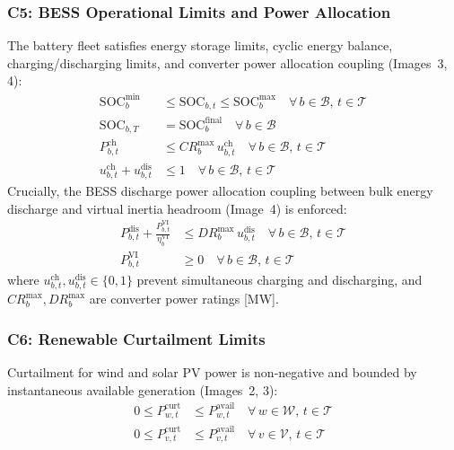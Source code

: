 \documentclass[journal]{IEEEtran}
\begin{document}
\subsubsection{C5: BESS Operational Limits and Power Allocation}
The battery fleet satisfies energy storage limits, cyclic energy balance, charging/discharging limits, and converter power allocation coupling (Images~3, 4):
\begin{align}
  \text{SOC}_b^{\min} &\leq \text{SOC}_{b,t} \leq \text{SOC}_b^{\max} \quad \forall\,b \in \mathcal{B},\,t \in \mathcal{T}
  \label{eq:soc_limits} \\
  \text{SOC}_{b,T} &= \text{SOC}_b^{\text{final}} \quad \forall\,b \in \mathcal{B}
  \label{eq:final_soc} \\
  P_{b,t}^{\text{ch}} &\leq CR_b^{\max}\,u_{b,t}^{\text{ch}} \quad \forall\,b \in \mathcal{B},\,t \in \mathcal{T}
  \label{eq:ch_limit} \\
  u_{b,t}^{\text{ch}} + u_{b,t}^{\text{dis}} &\leq 1 \quad \forall\,b \in \mathcal{B},\,t \in \mathcal{T}
  \label{eq:no_sim_ch_dis}
\end{align}
Crucially, the BESS discharge power allocation coupling between bulk energy discharge and virtual inertia headroom (Image~4) is enforced:
\begin{align}
  P_{b,t}^{\text{dis}} + \frac{P_{b,t}^{\text{VI}}}{\eta_b^{\text{VI}}} &\leq DR_b^{\max}\,u_{b,t}^{\text{dis}} \quad \forall\,b \in \mathcal{B},\,t \in \mathcal{T}
  \label{eq:bess_coupled_discharge} \\
  P_{b,t}^{\text{VI}} &\geq 0 \quad \forall\,b \in \mathcal{B},\,t \in \mathcal{T}
  \label{eq:vi_nonneg}
\end{align}
where $u_{b,t}^{\text{ch}}, u_{b,t}^{\text{dis}} \in \{0, 1\}$ prevent simultaneous charging and discharging, and $CR_b^{\max}, DR_b^{\max}$ are converter power ratings [MW].

\subsubsection{C6: Renewable Curtailment Limits}
Curtailment for wind and solar PV power is non-negative and bounded by instantaneous available generation (Images~2, 3):
\begin{align}
  0 \leq P_{w,t}^{\text{curt}} &\leq P_{w,t}^{\text{avail}} \quad \forall\,w \in \mathcal{W},\,t \in \mathcal{T}
  \label{eq:wt_curt_limit} \\
  0 \leq P_{v,t}^{\text{curt}} &\leq P_{v,t}^{\text{avail}} \quad \forall\,v \in \mathcal{V},\,t \in \mathcal{T}
  \label{eq:pv_curt_limit}
\end{align}
\end{document}

